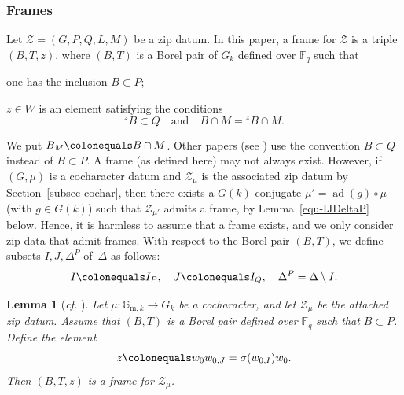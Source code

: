 \documentclass[11pt]{amsart}
\numberwithin{equation}{section}
\newtheorem{lemma}[theorem]{Lemma}
\theoremstyle{definition}
\theoremstyle{remark}
\newcommand{\Zcal}{{\mathcal Z}}
\newcommand{\FF}{\mathbb{F}}
\newcommand{\GG}{\mathbb{G}}
\DeclareMathOperator{\ad}{ad}
\begin{document}
\subsubsection{Frames} \label{sec-frames}
Let $\Zcal=(G,P,Q,L,M)$ be a zip datum. In this paper, a frame for $\Zcal$ is a triple $(B,T,z)$, where $(B,T)$ is a Borel pair of $G_k$ defined over $\FF_q$ such that 
\begin{equivlist}
    \item one has the inclusion $B\subset P$; 
    \item $z\in W$ is an element satisfying the conditions
\begin{equation}\label{eqBorel}
{}^z \! B \subset Q \quad \textrm{and} \quad
 B\cap M= {}^z \! B\cap M. 
\end{equation}
\end{equivlist}
We put $B_M\colonequals B\cap M$. Other papers (see \cite{Pink-Wedhorn-Ziegler-zip-data,Pink-Wedhorn-Ziegler-F-Zips-additional-structure, Koskivirta-Wedhorn-Hasse}) use the convention $B\subset Q$ instead of $B\subset P$. A frame (as defined here) may not always exist. However, if $(G,\mu)$ is a cocharacter datum and $\Zcal_\mu$ is the associated zip datum by Section~\ref{subsec-cochar}, then there exists a $G(k)$-conjugate $\mu'=\ad(g)\circ \mu$ (with $g\in G(k)$) such that $\Zcal_{\mu'}$ admits a frame, by Lemma~\ref{equ-IJDeltaP} below. Hence, it is harmless to assume that a frame exists, and we only consider zip data that admit frames. With respect to the Borel pair $(B,T)$, we define subsets $I,J,\Delta^P $ of~$\Delta$ as follows:
\begin{equation}\label{equ-IJDeltaP}
 I \colonequals I_P, \quad J \colonequals I_Q, \quad \Delta^P=\Delta\setminus I.  
\end{equation}

\begin{lemma}[\textit{cf.} {\cite[Lemma 2.3.4]{Goldring-Koskivirta-zip-flags}}]\label{lem-framemu}
Let $\mu \colon \GG_{\mathrm{m},k}\to G_k$ be a cocharacter, and let $\Zcal_\mu$ be the attached zip datum. Assume that $(B,T)$ is a Borel pair defined over $\FF_q$ such that $B\subset P$. Define the element
\begin{equation}\label{z-def}
z \colonequals w_0 w_{0,J}=\sigma(w_{0,I})w_0.
\end{equation}
Then $(B,T,z)$ is a frame for $\Zcal_\mu$.
\end{lemma}
\end{document}
